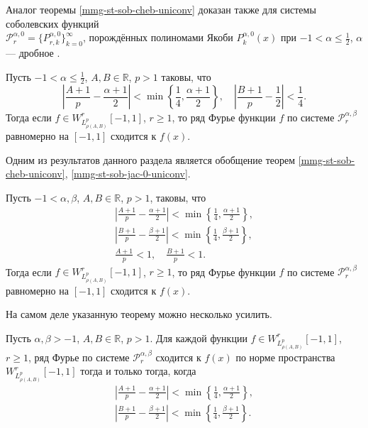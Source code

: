 Аналог теоремы \ref{mmg-st-sob-cheb-uniconv} доказан также для системы соболевских функций \\$\mathcal{P}_r^{\alpha,0}=\{P_{r,k}^{\alpha,0}\}_{k=0}^\infty$, порождённых полиномами Якоби $P_k^{\alpha,0}(x)$ при $-1<\alpha\le\frac{1}{2}$, $\alpha$ --- дробное \cite[с. 10, следствие 1]{mmg-Shii-matzam2017}.
\begin{theoremA}\label{mmg-st-sob-jac-0-uniconv}
	Пусть
	$-1<\alpha\le\frac{1}{2}$, $A,B\in\mathbb{R}$, $p>1$ таковы, что
	\begin{equation*}
		\left|\frac{A+1}{p}-\frac{\alpha+1}{2}\right|<
		\min\left\{\frac{1}{4},\frac{\alpha+1}{2}\right\}, \quad
		\left|\frac{B+1}{p}-\frac{1}{2}\right|<\frac{1}{4}.
	\end{equation*}
	Тогда если $f\in W^r_{L_{\rho(A,B)}^p}[-1,1]$, $r \ge 1$, то ряд Фурье функции $f$ по системе $\mathcal{P}_r^{\alpha,\beta}$ равномерно на $[-1,1]$ сходится к $f(x)$.
\end{theoremA}

Одним из результатов данного раздела является обобщение теорем \ref{mmg-st-sob-cheb-uniconv}, \ref{mmg-st-sob-jac-0-uniconv}.
\begin{theorem}\label{mmg-sob-uni-conv-muck}
	Пусть $-1 < \alpha,\beta$, $A,B \in \mathbb{R}$, $p>1$, таковы, что
	\begin{gather}
		\label{mmg-muck-A}
		\left|\frac{A+1}{p}-\frac{\alpha+1}{2}\right|<
		\min\left\{\frac{1}{4},\frac{\alpha+1}{2}\right\},\\
		\label{mmg-muck-B}
		\left|\frac{B+1}{p}-\frac{\beta+1}{2}\right|<\min\left\{\frac{1}{4},\frac{\beta+1}{2}\right\},\\
		\label{mmg-Lpw-in-L1-cond}
		\frac{A+1}{p} < 1, \quad \frac{B+1}{p} < 1.
	\end{gather}
	Тогда если $f\in W^r_{L_{\rho(A,B)}^p}[-1,1]$, $r \ge 1$, то ряд Фурье функции $f$ по системе $\mathcal{P}_r^{\alpha,\beta}$ равномерно на $[-1,1]$ сходится к $f(x)$.
\end{theorem}
На самом деле указанную теорему можно несколько усилить.
\begin{theorem}\label{mmg-sob-conv-muck}
	Пусть $\alpha,\beta > -1$, $A,B \in \mathbb{R}$, $p>1$. Для каждой функции $f\in W^r_{L_{\rho(A,B)}^p}[-1,1]$, $r \ge 1$, ряд Фурье по системе $\mathcal{P}_r^{\alpha,\beta}$ сходится к $f(x)$ по норме пространства $W^r_{L_{\rho(A,B)}^p}[-1,1]$ тогда и только тогда, когда
	\begin{gather}
		\label{mmg-muck-A1}
		\left|\frac{A+1}{p}-\frac{\alpha+1}{2}\right|<
		\min\left\{\frac{1}{4},\frac{\alpha+1}{2}\right\},\\
		\label{mmg-muck-B1}
		\left|\frac{B+1}{p}-\frac{\beta+1}{2}\right|<\min\left\{\frac{1}{4},\frac{\beta+1}{2}\right\}.
	\end{gather}
\end{theorem}

